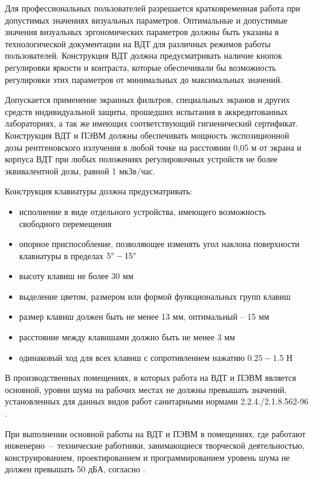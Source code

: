 Для профессиональных пользователей разрешается кратковременная работа при допустимых
значениях визуальных параметров. Оптимальные и допустимые значения визуальных
эргономических параметров должны быть указаны в технологической документации на
ВДТ для различных режимов работы пользователей. Конструкция ВДТ должна предусматривать
наличие кнопок регулировки яркости и контраста, которые обеспечивали бы возможность
регулировки этих параметров от минимальных до максимальных значений.

Допускается применение экранных фильтров, специальных экранов и других средств
индивидуальной защиты, прошедших испытания в аккредитованных лабораториях, а так
же имеющих соответствующий гигиенический сертификат. Конструкция ВДТ и ПЭВМ должны
обеспечивать мощность экспозиционной дозы рентгеновского излучения в любой точке
на расстоянии 0,05 м от экрана и корпуса ВДТ при любых положениях регулировочных
устройств не более эквивалентной дозы, равной 1 мкЗв/час.

Конструкция клавиатуры должна предусматривать:

\begin{itemize}
    \item исполнение в виде отдельного устройства, имеющего возможность свободного
            перемещения
    \item опорное приспособление, позволяющее изменять угол наклона поверхности
            клавиатуры в пределах $5 \degree - 15 \degree$
    \item высоту клавиш не более 30 мм
    \item выделение цветом, размером или формой функциональных групп клавиш
    \item размер клавиш должен быть не менее 13 мм, оптимальный – 15 мм
    \item расстояние между клавишами должно быть не менее 3 мм
    \item одинаковый ход для всех клавиш с сопротивлением нажатию $0.25 - 1.5$ Н
\end{itemize}


В производственных помещениях, в которых работа на ВДТ и ПЭВМ является основной,
уровни шума на рабочих местах не должны превышать значений, установленных для
данных видов работ санитарными нормами 2.2.4./2.1.8.562-96
\cite{ecology_sanitary_norm_562_96}.

При выполнении основной работы на ВДТ и ПЭВМ в помещениях, где работают
инженерно~--~технические работники, занимающиеся творческой деятельностью, конструированием,
проектированием и программированием уровень шума не должен превышать 50 дБА,
согласно \cite[табл. 2]{ecology_sanitary_norm_562_96}.

